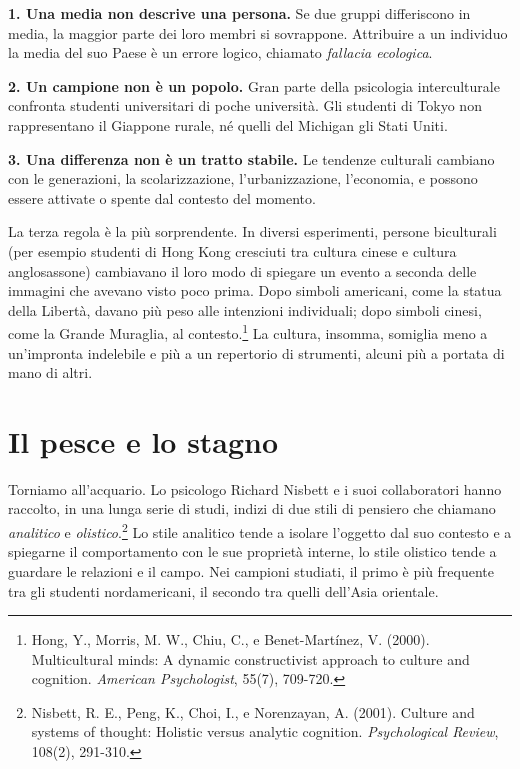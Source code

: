 \begin{concetto}
\textbf{1. Una media non descrive una persona.} Se due gruppi differiscono in media, la maggior parte dei loro membri si sovrappone. Attribuire a un individuo la media del suo Paese è un errore logico, chiamato \textit{fallacia ecologica}.

\textbf{2. Un campione non è un popolo.} Gran parte della psicologia interculturale confronta studenti universitari di poche università. Gli studenti di Tokyo non rappresentano il Giappone rurale, né quelli del Michigan gli Stati Uniti.

\textbf{3. Una differenza non è un tratto stabile.} Le tendenze culturali cambiano con le generazioni, la scolarizzazione, l'urbanizzazione, l'economia, e possono essere attivate o spente dal contesto del momento.
\end{concetto}

La terza regola è la più sorprendente. In diversi esperimenti, persone biculturali (per esempio studenti di Hong Kong cresciuti tra cultura cinese e cultura anglosassone) cambiavano il loro modo di spiegare un evento a seconda delle immagini che avevano visto poco prima. Dopo simboli americani, come la statua della Libertà, davano più peso alle intenzioni individuali; dopo simboli cinesi, come la Grande Muraglia, al contesto.\footnote{Hong, Y., Morris, M. W., Chiu, C., e Benet-Martínez, V. (2000). Multicultural minds: A dynamic constructivist approach to culture and cognition. \textit{American Psychologist}, 55(7), 709-720.} La cultura, insomma, somiglia meno a un'impronta indelebile e più a un repertorio di strumenti, alcuni più a portata di mano di altri.

\section{Il pesce e lo stagno}

Torniamo all'acquario. Lo psicologo Richard Nisbett e i suoi collaboratori hanno raccolto, in una lunga serie di studi, indizi di due stili di pensiero che chiamano \textit{analitico} e \textit{olistico}.\footnote{Nisbett, R. E., Peng, K., Choi, I., e Norenzayan, A. (2001). Culture and systems of thought: Holistic versus analytic cognition. \textit{Psychological Review}, 108(2), 291-310.} Lo stile analitico tende a isolare l'oggetto dal suo contesto e a spiegarne il comportamento con le sue proprietà interne, lo stile olistico tende a guardare le relazioni e il campo. Nei campioni studiati, il primo è più frequente tra gli studenti nordamericani, il secondo tra quelli dell'Asia orientale.

